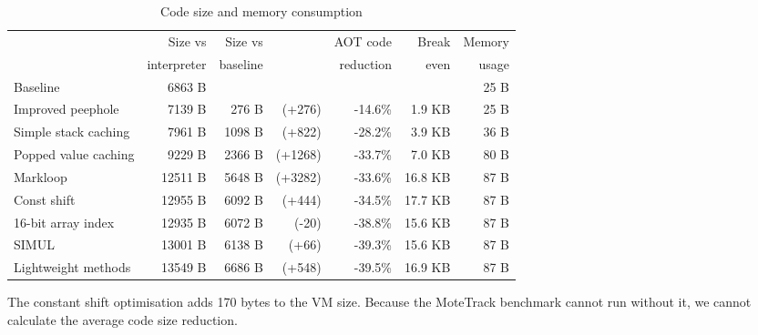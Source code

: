\begin{table}
\centering
\caption{Code size and memory consumption}
\label{tbl-code-size-and-memory-consumption}
    \begin{threeparttable}
    \begin{tabular}{lrrrrrr} %
    \toprule
                              & Size vs     & Size vs  &                      & AOT code  &   Break & Memory    \\
                              & interpreter & baseline &                      & reduction &   even  & usage     \\
    \midrule
    \midrule
    Baseline                  &     6863 B  &          &                      &           &         & 25 B      \\
    Improved peephole         &     7139 B  &   276 B  & \scriptsize   (+276) &  -14.6\%  &  1.9 KB & 25 B      \\
    Simple stack caching      &     7961 B  &  1098 B  & \scriptsize   (+822) &  -28.2\%  &  3.9 KB & 36 B      \\
    Popped value caching      &     9229 B  &  2366 B  & \scriptsize  (+1268) &  -33.7\%  &  7.0 KB & 80 B      \\
    Markloop                  &    12511 B  &  5648 B  & \scriptsize  (+3282) &  -33.6\%  & 16.8 KB & 87 B      \\
    Const shift               &    12955 B  &  6092 B  & \scriptsize   (+444) &  -34.5\%  & 17.7 KB & 87 B      \\
    16-bit array index        &    12935 B  &  6072 B  & \scriptsize    (-20) &  -38.8\%  & 15.6 KB & 87 B      \\
    SIMUL                     &    13001 B  &  6138 B  & \scriptsize    (+66) &  -39.3\%  & 15.6 KB & 87 B      \\
    Lightweight methods       &    13549 B  &  6686 B  & \scriptsize   (+548) &  -39.5\%  & 16.9 KB & 87 B      \\
    \bottomrule
    \end{tabular}
    \begin{tablenotes}
        \item The constant shift optimisation adds 170 bytes to the VM size. Because the MoteTrack benchmark cannot run without it, we cannot calculate the average code size reduction.
    \end{tablenotes}
    \end{threeparttable}
\end{table}
